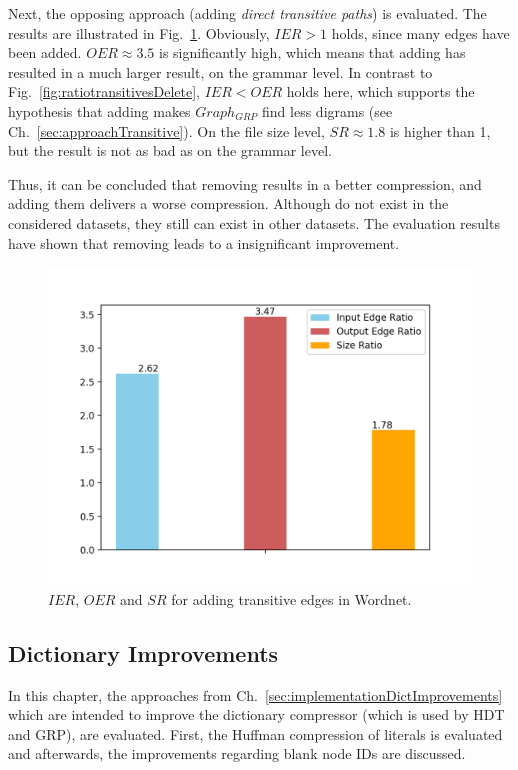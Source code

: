 Next, the opposing approach (adding \textit{direct transitive paths}) is evaluated. The results are illustrated in Fig.~\ref{fig:ratiotransitivesAdd}. Obviously, $ IER>1 $ holds, since many edges have been added. $OER\approx3.5$ is significantly high, which means that adding \dtps has resulted in a much larger result, on the grammar level. In contrast to Fig.~\ref{fig:ratiotransitivesDelete}, $IER<OER$ holds here, which supports the hypothesis that adding \dtps makes $Graph_{GRP}$ find less digrams (see Ch.~\ref{sec:approachTransitive}). On the file size level, $SR\approx1.8$ is higher than 1, but the result is not as bad as on the grammar level. 

Thus, it can be concluded that removing \dtps results in a better compression, and adding them delivers a worse compression. Although \dtps do not exist in the considered datasets, they still can exist in other datasets. The evaluation results have shown that removing \dtps leads to a insignificant improvement. 

\begin{figure}
	\centering
	\includegraphics[width=0.8\linewidth]{figures/4_evaluation/ontology/ratioTransitivesAdd}
	\caption{$IER$, $OER$ and $SR$ for adding transitive edges in Wordnet.}
	\label{fig:ratiotransitivesAdd}
\end{figure}


\subsection{Dictionary Improvements}\label{sec:evaluationDictImprovements}

In this chapter, the approaches from Ch.~\ref{sec:implementationDictImprovements} which are intended to improve the dictionary compressor \DHDT{} (which is used by HDT and GRP), are evaluated. First, the Huffman compression of literals is evaluated and afterwards, the improvements regarding blank node IDs are discussed. 

